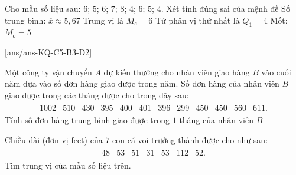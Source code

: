 \begin{ex}%
	Cho mẫu số liệu sau: $6$; $5$; $6$; $7$; $8$; $4$; $6$; $5$; $4$. Xét tính đúng sai của mệnh đề
	\choiceTF
	{\True Số trung bình: $\overline x\approx 5{,}67$}
	{\True Trung vị là $M_e=6$}
	{Tứ phân vị thứ nhất là $Q_1=4$}
	{Mốt: $M_o=5$}	
\end{ex}
[ans/ans-KQ-C5-B3-D2]
\caukq
\begin{ex}%
	Một công ty vận chuyển $A$ dự kiến thưởng cho nhân viên giao hàng $B$ vào cuối năm dựa vào số đơn hàng giao được trong năm. Số đơn hàng của nhân viên ${{B}}$ giao được trong các tháng được cho trong dãy sau:
	\allowdisplaybreaks
	\begin{eqnarray*}
		{\begin{array}{llllllllllll}
				1002 & 510 & 430 & 395 & 400 & 401 & 396 & 299 & 450 & 450 & 560 & 611.
			\end{array}
		}
	\end{eqnarray*}
	Tính số đơn hàng trung bình giao được trong $1$ tháng của nhân viên ${B}$
\end{ex}
\begin{ex}%
	Chiều dài (đơn vị feet) của $7$ con cá voi trưởng thành được cho như sau:
	\allowdisplaybreaks
	\begin{eqnarray*}
		\begin{array}{lllllll}
			48 & 53 & 51 & 31 & 53 & 112 & 52.
		\end{array}
	\end{eqnarray*}	Tìm trung vị của mẫu số liệu trên.
\end{ex}
